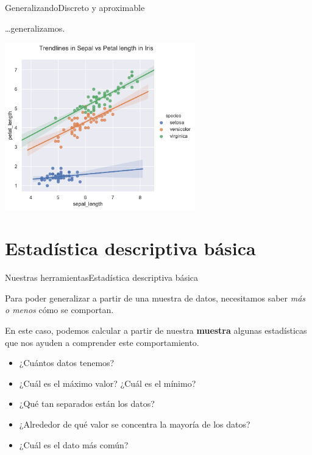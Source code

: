 \documentclass[spanish, c, dvipsnames]{beamer}
\begin{document}
\begin{frame}{Generalizando}{Discreto y aproximable}

    \dots generalizamos.

    \begin{center}
        \includegraphics[width=0.62\textwidth]{regplot.pdf}
    \end{center}
    
\end{frame}

\section{Estadística descriptiva básica}

\begin{frame}{Nuestras herramientas}{Estadística descriptiva básica}

Para poder generalizar a partir de una \alert{muestra} de datos, necesitamos saber \textit{más o menos} cómo se comportan. \pause

\bigskip

En este caso, podemos calcular a partir de nuestra \textbf{muestra} algunas \alert{estadísticas} que nos ayuden a comprender este comportamiento. \pause

\begin{itemize}[<+->]
    \item ¿Cuántos datos tenemos?
    \item ¿Cuál es el máximo valor? ¿Cuál es el mínimo?
    \item ¿Qué tan separados están los datos?
    \item ¿Alrededor de qué valor se concentra la mayoría de los datos?
    \item ¿Cuál es el dato más común?
\end{itemize}
\end{frame}
\end{document}
